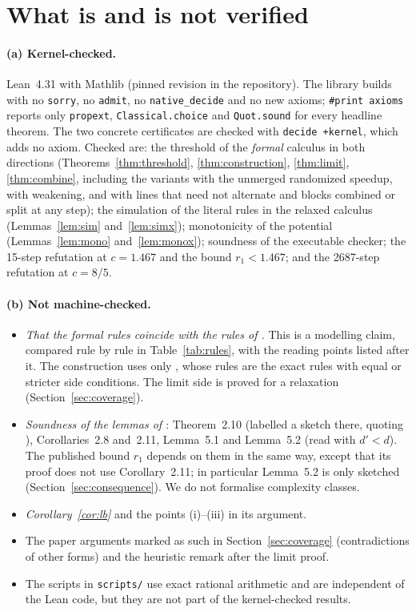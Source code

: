 \documentclass[11pt]{article}
\theoremstyle{definition}
\newcommand{\leanus}{\textunderscore\allowbreak}
\newcommand{\lean}[1]{\ifmmode\text{\ttfamily #1}\else{\ttfamily\let\_\leanus #1}\fi}
\begin{document}
\section{What is and is not verified}\label{sec:verified}

\paragraph{(a) Kernel-checked.}
Lean~4.31 with Mathlib (pinned revision in the repository). The library builds with no \texttt{sorry}, no \texttt{admit}, no \texttt{native\_decide} and no new axioms; \texttt{\#print axioms} reports only \texttt{propext}, \texttt{Classical.choice} and \texttt{Quot.sound} for every headline theorem. The two concrete certificates are checked with \texttt{decide +kernel}, which adds no axiom. Checked are: the threshold of the \emph{formal} calculus in both directions (Theorems~\ref{thm:threshold}, \ref{thm:construction}, \ref{thm:limit}, \ref{thm:combine}, including the variants with the unmerged randomized speedup, with weakening, and with lines that need not alternate and blocks combined or split at any step); the simulation of the literal rules in the relaxed calculus (Lemmas~\ref{lem:sim} and~\ref{lem:simx}); monotonicity of the potential (Lemmas~\ref{lem:mono} and~\ref{lem:monox}); soundness of the executable checker; the 15-step refutation at $c=1.467$ and the bound $r_1<1.467$; and the 2687-step refutation at $c=8/5$.

\paragraph{(b) Not machine-checked.}
\begin{itemize}
\item \emph{That the formal rules coincide with the rules of \cite{MW21}.} This is a modelling claim, compared rule by rule in Table~\ref{tab:rules}, with the reading points listed after it. The construction uses only \lean{MWL.Step}, whose rules are the exact rules with equal or stricter side conditions. The limit side is proved for a relaxation (Section~\ref{sec:coverage}).
\item \emph{Soundness of the lemmas of \cite{MW21}}: Theorem~2.10 (labelled a sketch there, quoting \cite{DvM06}), Corollaries~2.8 and~2.11, Lemma~5.1 and Lemma~5.2 (read with $d'<d$). The published bound $r_1$ depends on them in the same way, except that its proof does not use Corollary~2.11; in particular Lemma~5.2 is only sketched (Section~\ref{sec:consequence}). We do not formalise complexity classes.
\item \emph{Corollary~\ref{cor:lb}} and the points (i)--(iii) in its argument.
\item The paper arguments marked as such in Section~\ref{sec:coverage} (contradictions of other forms) and the heuristic remark after the limit proof.
\item The scripts in \texttt{scripts/} use exact rational arithmetic and are independent of the Lean code, but they are not part of the kernel-checked results.
\end{itemize}
\end{document}
